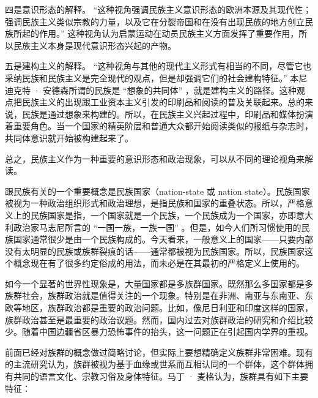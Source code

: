 四是意识形态的解释。 “这种视角强调民族主义意识形态的欧洲本源及其现代性；强调民族主义类似宗教的力量，以及它在分裂帝国和在没有出现民族的地方创立民族所起的作用。” 这种视角认为启蒙运动在动员民族主义方面发挥了重要作用，所以民族主义本身是现代意识形态兴起的产物。

五是建构主义的解释。 “这种视角与其他的现代主义形式有相当的不同，尽管它也采纳民族和民族主义是完全现代的观点，但是却强调它们的社会建构特征。” 本尼迪克特 · 安德森所谓的民族是 “想象的共同体” ，就是建构主义的路径。这种观点把民族主义的出现跟工业资本主义引发的印刷品和阅读的普及关联起来。总的来说，民族是通过想象来构建的。所以，在民族主义兴起过程中，印刷品和媒体扮演着重要角色。当一个国家的精英阶层和普通大众都开始阅读类似的报纸与杂志时，共同体意识就开始被构建起来了。

总之，民族主义作为一种重要的意识形态和政治现象，可以从不同的理论视角来解读。


跟民族有关的一个重要概念是民族国家（nation-state 或 nation state）。民族国家被视为一种政治组织形式和政治理想，是指民族和国家的重叠状态。所以，严格意义上的民族国家是指，一个国家就是一个民族，一个民族成为一个国家，亦即意大利政治家马志尼所言的 “一国一族，一族一国” 。但是，如今人们所习惯使用的民族国家通常很少是由一个民族构成的。今天看来，一般意义上的国家——只要内部没有太明显的民族或族群裂痕的话——通常都被视为民族国家。所以，民族国家这个概念现在有了很多约定俗成的用法，而未必是在其最初的严格定义上使用的。

如今一个显著的世界性现象是，大量国家都是多族群国家。既然那么多国家都是多族群社会，族群政治就是值得关注的一个现象。特别是在非洲、南亚与东南亚、东欧等地区，族群政治都是重要的政治问题。比如，像尼日利亚和印度这样的国家，族群政治甚至是最重要的政治议题。然而，国内过去对族群政治的研究和介绍比较少。随着中国边疆省区暴力恐怖事件的抬头，这一问题正在引起国内学界的重视。

前面已经对族群的概念做过简略讨论，但实际上要想精确定义族群非常困难。现有的主流研究认为，族群被视为基于血缘或世系而互相认同的一个群体，这个群体拥有共同的语言文化、宗教习俗及身体特征。马丁 · 麦格认为，族群具有如下主要特征：


